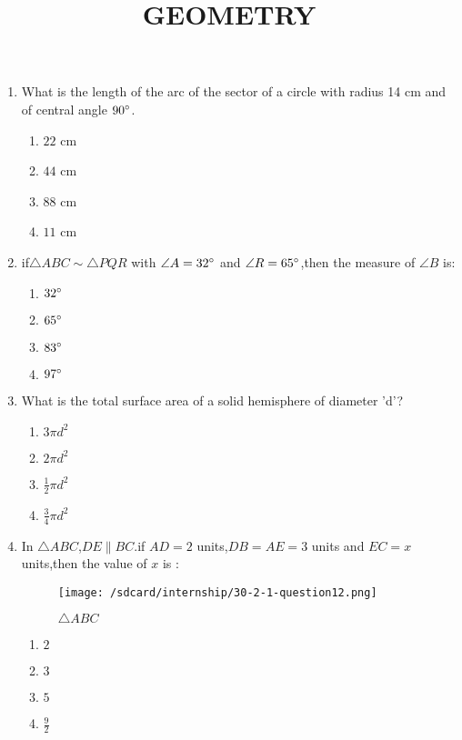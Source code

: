 \documentclass{article}
\title{GEOMETRY}
\begin{document}
\maketitle
\begin{enumerate}
    \item What is the length of the arc of the sector of a circle with radius 14 cm and of central angle $90\degree$.
    \begin{enumerate}
        \item $22$ cm
        \item $44$ cm
        \item $88$ cm
        \item $11$ cm
    \end{enumerate}
    \item if$\triangle ABC \sim \triangle PQR$ with $\angle A=32\degree$ and $\angle R=65\degree$,then the measure of $\angle B$ is:
    \begin{enumerate}
        \item $32\degree$
        \item $65\degree$
        \item $83\degree$
        \item $97\degree$
    \end{enumerate}
    \item What is the total surface area of a solid hemisphere of diameter 'd'?
    \begin{enumerate}
        \item $3 \pi d^2$
        \item $2 \pi d^2$
        \item $\frac{1}{2} \pi d^2$
        \item $\frac{3}{4} \pi d^2$
    \end{enumerate}
    \item In $\triangle ABC$,$DE \parallel BC$.if $AD=2$ units,$DB=AE=3$ units and $EC=x$ units,then the value of $x$ is :
    \begin{figure}[!ht]
        \centering
        \texttt{[image: /sdcard/internship/30-2-1-question12.png]}
        \caption{$\triangle ABC$}
        \label{fig:enter-label}
    \end{figure}
            \begin{enumerate}
                \item $2$
                \item $3$
                \item $5$
                \item $\frac{9}{2}$

\end{enumerate}
\end{enumerate}
\end{document}
